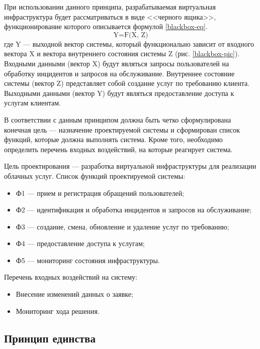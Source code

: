При использовании данного принципа, разрабатываемая виртуальная инфраструктура будет рассматриваться в виде <<черного ящика>>, функционирование которого описывается формулой \ref{blackbox-eq}.
\begin{equation} \label{blackbox-eq}
\text{Y=F(X, Z)}
\end{equation}
где Y --- выходной вектор системы, который функционально зависит от входного вектора X и вектора внутреннего состояния системы Z (рис. \ref{blackbox-pic}).
Входными данными (вектор X) будут являться запросы пользователей на обработку инцидентов и запросов на обслуживание.
Внутреннее состояние системы (вектор Z) представляет собой создание услуг по требованию клиента.
Выходными данными (вектор Y) будут являться предоставление доступа к услугам клиентам.

В соответствии с данным принципом должна быть четко сформулирована конечная цель --- назначение проектируемой системы и сформирован список функций, которые должна выполнять система.
Кроме того, необходимо определить перечень входных воздействий, на которые реагирует система.

Цель проектирования --- разработка виртуальной инфраструктуры для реализации облачных услуг.
Список функций проектируемой системы:
\begin{itemize}
  \item Ф1 --- прием и регистрация обращений пользователей;
  \item Ф2 --- идентификация и обработка инцидентов и запросов на обслуживание;
  \item Ф3 --- создание, смена, обновление и удаление услуг по требованию;
  \item Ф4 --- предоставление доступа к услугам;
  \item Ф5 --- мониторинг состояния инфраструктуры.
\end{itemize}

Перечень входных воздействий на систему:
\begin{itemize}
  \item Внесение изменений данных о заявке;
  \item Мониторинг хода решения.
\end{itemize}

\subsection{Принцип единства}

